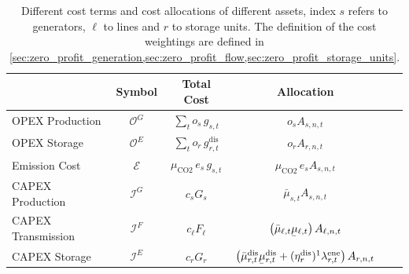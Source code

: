 \documentclass[11pt,twocolumn]{article}
\newcommand{\ubar}[1]{\underaccent{\bar}{#1}}
\newcommand{\generation}{g_{s,t}}
\newcommand{\capacitygeneration}{G_{s}}
\newcommand{\operationalpricegeneration}{o_{s}}
\newcommand{\capitalpricegeneration}{c_{s}}
\newcommand{\muuppergeneration}{\bar{\mu}_{s,t}}
\newcommand{\capacityflow}{F_{\ell}}
\newcommand{\capitalpriceflow}{c_{\ell}}
\newcommand{\mulowerflow}{\ubar{\mu}_{\ell,t}}
\newcommand{\muupperflow}{\bar{\mu}_{\ell,t}}
\newcommand{\storage}{g_{r,t}}
\newcommand{\storagedispatch}{\storage^\text{dis}}
\newcommand{\efficiency}{\eta_{r}}
\newcommand{\efficiencydispatch}{\efficiency^\text{dis}}
\newcommand{\operationalpricestorage}{o_r}
\newcommand{\capitalpricestorage}{c_r}
\newcommand{\capacitystorage}{G_r}
\newcommand{\mulowerstoragedispatch}{\ubar{\mu}_{r,t}^\text{dis}}
\newcommand{\muupperstoragedispatch}{\bar{\mu}_{r,t}^\text{dis}}
\newcommand{\mustateofcharge}{\lambda^\text{ene}_{r,t}}
\newcommand{\emission}{e_{s}}
\newcommand{\emissionprice}{\mu_{\text{CO2}}}
\newcommand{\opexgeneration}{\mathcal{O}^G}
\newcommand{\opexstorage}{\mathcal{O}^E}
\newcommand{\capexgeneration}{\mathcal{I}^G}
\newcommand{\capexflow}{\mathcal{I}^F}
\newcommand{\capexstorage}{\mathcal{I}^E}
\newcommand{\emissioncost}{\mathcal{E}}
\newcommand{\allocategeneration}[1][s, n]{A_{#1,t}}
\newcommand{\allocatestoragedispatch}[1][r, n]{A_{#1,t}}
\newcommand{\allocateflow}[1][n]{A_{\ell,#1,t}}
\begin{document}
\begin{table}[t]
    \begin{center}
        \begin{tabular}{l|c|c|c|c|c}
                               & Symbol             & Total Cost                                              & Allocation                                                                                                                               \\
            \toprule
            OPEX Production    & $\opexgeneration$  & $\sum_{t} \operationalpricegeneration \, \generation$   & $\operationalpricegeneration \allocategeneration $                                                                                       \\
            OPEX Storage       & $\opexstorage$     & $\sum_{t} \operationalpricestorage \, \storagedispatch$ & $\operationalpricestorage \allocatestoragedispatch $                                                                                     \\
            \midrule
            Emission Cost      & $\emissioncost$    & $ \emissionprice \, \emission \, \generation$           & $\emissionprice \,\emission \allocategeneration$                                                                                         \\
            \midrule
            CAPEX Production   & $\capexgeneration$ & $ \capitalpricegeneration \capacitygeneration$          & $\muuppergeneration \allocategeneration$                                                                                                 \\
            CAPEX Transmission & $\capexflow$       & $ \capitalpriceflow \capacityflow$                      & $\left(\muupperflow  \mulowerflow \right) \allocateflow$                                                                                 \\
            CAPEX Storage      & $\capexstorage$    & $ \capitalpricestorage \capacitystorage$                & $ \left(\muupperstoragedispatch  \mulowerstoragedispatch  + (\efficiencydispatch )^{1} \mustateofcharge\right) \allocatestoragedispatch$ \\
        \end{tabular}
    \end{center}
    \caption{Different cost terms and cost allocations of different assets, index $s$ refers to generators, $\ell$ to lines and $r$ to storage units. The definition of the cost weightings are defined in \cref{sec:zero_profit_generation,sec:zero_profit_flow,sec:zero_profit_storage_units}.}
    \label{tab:cost_allocation_map}
\end{table}
\end{document}
